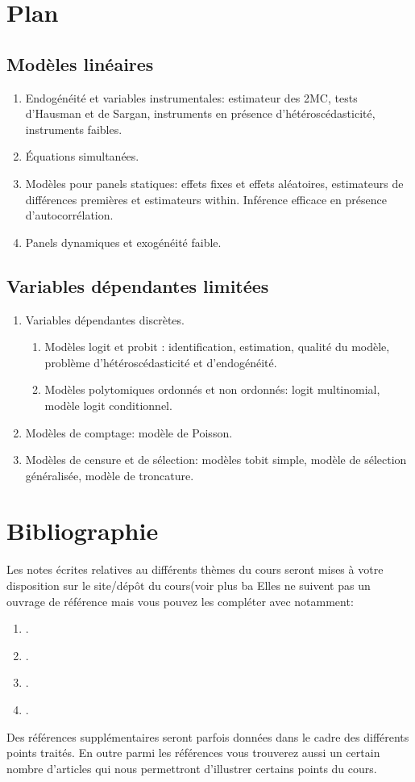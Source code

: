  \section{Plan}
 \subsection{Modèles linéaires}
\begin{enumerate}
 \item Endogénéité et variables instrumentales: estimateur des 2MC, tests d'Hausman et de Sargan,
instruments en présence d'hétéroscédasticité, instruments faibles.
\item Équations simultanées.
\item Modèles pour panels statiques: effets fixes et effets aléatoires, estimateurs de différences premières 
et estimateurs within. Inférence efficace en présence d'autocorrélation.
\item Panels dynamiques et exogénéité faible.
\end{enumerate}

\subsection{Variables dépendantes limitées}
\begin{enumerate}
\item Variables dépendantes discrètes.
\begin{enumerate}
\item Modèles logit et probit : identification, estimation, qualité du modèle, problème d'hétéroscédasticité et d'endogénéité.
\item Modèles polytomiques ordonnés et non ordonnés: logit multinomial, modèle logit conditionnel.
\end{enumerate}
\item Modèles de comptage: modèle de Poisson.
\item Modèles de censure et de sélection: modèles tobit simple, modèle de sélection généralisée, 
modèle de troncature.
\end{enumerate}


\section{Bibliographie}

Les notes écrites relatives au différents thèmes du cours seront mises à votre disposition sur le site/dépôt du cours(voir plus ba
Elles ne suivent pas un ouvrage de référence mais vous pouvez les compléter avec  notamment:
\begin{enumerate}[-]
\item \cite{Amemiya1985}.
\item \cite{ap2009}.
\item \cite{Hansen2017}.
\item \cite{Wooldridge2010}.
\end{enumerate}
Des références supplémentaires seront parfois données dans le cadre des différents points traités.
En outre parmi les références vous trouverez aussi un certain nombre d'articles qui nous 
permettront d'illustrer certains points du cours. 


